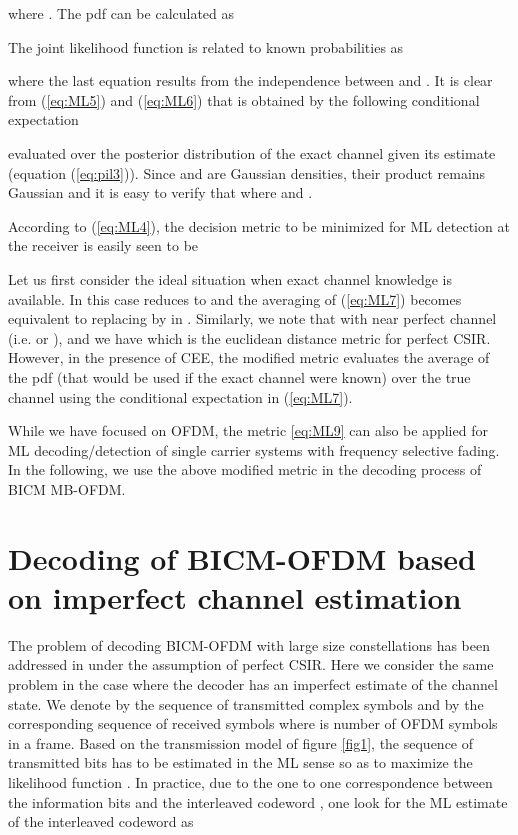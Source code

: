 \documentclass{article}
\begin{document}
where . 
The pdf  can be calculated as
    
The joint likelihood function  is related to known probabilities as
 
where the last equation results from the independence between  and . 
It is clear from (\ref{eq:ML5}) and (\ref{eq:ML6}) that  is obtained by the following conditional expectation 

evaluated over the posterior distribution of the exact channel given its estimate (equation (\ref{eq:pil3})).    
Since   and  are Gaussian densities, their product remains Gaussian and it is easy to verify that  where  and . 
         
According to (\ref{eq:ML4}), the decision metric to be minimized for ML detection at the receiver is easily seen to be


Let us first consider the ideal situation when exact channel knowledge is available. In this case  reduces to  and the averaging  of (\ref{eq:ML7}) becomes equivalent to replacing  by  in .  
Similarly, we note that with near perfect channel (i.e.  or ),  and we have  which is the euclidean distance metric for perfect CSIR. However, in the presence of CEE, the modified metric evaluates the average of the pdf  (that would be used if the exact channel were known) over the true channel  using the conditional expectation in (\ref{eq:ML7}). 

While we have focused on OFDM, the metric \eqref{eq:ML9} can also be applied for ML decoding/detection of single carrier systems with frequency selective fading. In the following, we use the above modified metric in the decoding process of BICM MB-OFDM.        
\section{Decoding of BICM-OFDM based on imperfect channel estimation}
\label{sec:dem}
The problem of decoding BICM-OFDM with large size constellations has been addressed in \cite{muq1} under the assumption of perfect CSIR. 
Here we consider the same problem in the case where the decoder has an imperfect estimate of the channel state. 
We denote by  the sequence of transmitted complex symbols and by  the corresponding sequence of received symbols where  is number of OFDM symbols in a frame.   
Based on the transmission model of figure \ref{fig1}, the sequence of transmitted bits  has to be estimated in the ML sense so as to maximize the likelihood function . In practice, due to the one to one correspondence between the information bits and the interleaved codeword , one look for the ML estimate  of the interleaved codeword as
    
\end{document}
